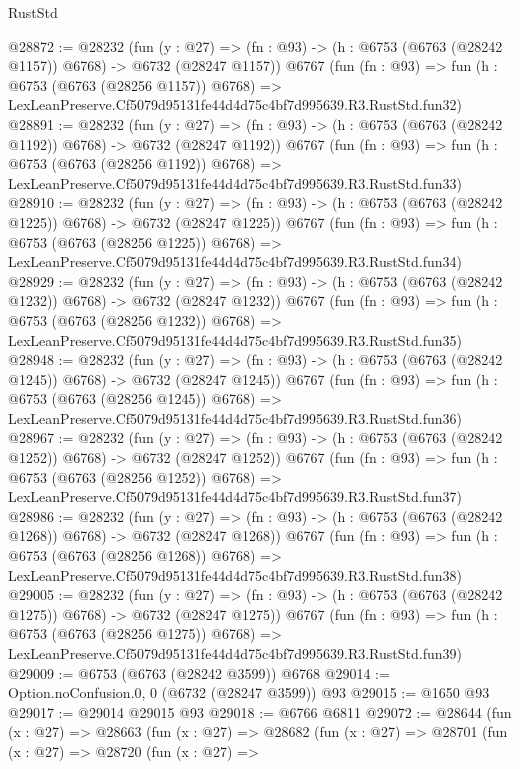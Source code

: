 \begin{lexlean}{RustStd}
\begin{coremodule}
@28872 := @28232
    (fun (y : @27) =>
    (fn : @93) -> (h : @6753 (@6763 (@28242 @1157)) @6768) -> @6732 (@28247 @1157))
    @6767
    (fun (fn : @93) =>
    fun (h : @6753 (@6763 (@28256 @1157)) @6768) =>
    LexLeanPreserve.Cf5079d95131fe44d4d75c4bf7d995639.R3.RustStd.fun32)
@28891 := @28232
    (fun (y : @27) =>
    (fn : @93) -> (h : @6753 (@6763 (@28242 @1192)) @6768) -> @6732 (@28247 @1192))
    @6767
    (fun (fn : @93) =>
    fun (h : @6753 (@6763 (@28256 @1192)) @6768) =>
    LexLeanPreserve.Cf5079d95131fe44d4d75c4bf7d995639.R3.RustStd.fun33)
@28910 := @28232
    (fun (y : @27) =>
    (fn : @93) -> (h : @6753 (@6763 (@28242 @1225)) @6768) -> @6732 (@28247 @1225))
    @6767
    (fun (fn : @93) =>
    fun (h : @6753 (@6763 (@28256 @1225)) @6768) =>
    LexLeanPreserve.Cf5079d95131fe44d4d75c4bf7d995639.R3.RustStd.fun34)
@28929 := @28232
    (fun (y : @27) =>
    (fn : @93) -> (h : @6753 (@6763 (@28242 @1232)) @6768) -> @6732 (@28247 @1232))
    @6767
    (fun (fn : @93) =>
    fun (h : @6753 (@6763 (@28256 @1232)) @6768) =>
    LexLeanPreserve.Cf5079d95131fe44d4d75c4bf7d995639.R3.RustStd.fun35)
@28948 := @28232
    (fun (y : @27) =>
    (fn : @93) -> (h : @6753 (@6763 (@28242 @1245)) @6768) -> @6732 (@28247 @1245))
    @6767
    (fun (fn : @93) =>
    fun (h : @6753 (@6763 (@28256 @1245)) @6768) =>
    LexLeanPreserve.Cf5079d95131fe44d4d75c4bf7d995639.R3.RustStd.fun36)
@28967 := @28232
    (fun (y : @27) =>
    (fn : @93) -> (h : @6753 (@6763 (@28242 @1252)) @6768) -> @6732 (@28247 @1252))
    @6767
    (fun (fn : @93) =>
    fun (h : @6753 (@6763 (@28256 @1252)) @6768) =>
    LexLeanPreserve.Cf5079d95131fe44d4d75c4bf7d995639.R3.RustStd.fun37)
@28986 := @28232
    (fun (y : @27) =>
    (fn : @93) -> (h : @6753 (@6763 (@28242 @1268)) @6768) -> @6732 (@28247 @1268))
    @6767
    (fun (fn : @93) =>
    fun (h : @6753 (@6763 (@28256 @1268)) @6768) =>
    LexLeanPreserve.Cf5079d95131fe44d4d75c4bf7d995639.R3.RustStd.fun38)
@29005 := @28232
    (fun (y : @27) =>
    (fn : @93) -> (h : @6753 (@6763 (@28242 @1275)) @6768) -> @6732 (@28247 @1275))
    @6767
    (fun (fn : @93) =>
    fun (h : @6753 (@6763 (@28256 @1275)) @6768) =>
    LexLeanPreserve.Cf5079d95131fe44d4d75c4bf7d995639.R3.RustStd.fun39)
@29009 := @6753 (@6763 (@28242 @3599)) @6768
@29014 := Option.noConfusion.{0, 0} (@6732 (@28247 @3599)) @93
@29015 := @1650 @93
@29017 := @29014 @29015 @93
@29018 := @6766 @6811
@29072 := @28644
    (fun (x : @27) =>
    @28663
      (fun (x : @27) =>
      @28682
        (fun (x : @27) =>
        @28701
          (fun (x : @27) =>
          @28720
            (fun (x : @27) =>

\end{coremodule}
\end{lexlean}
